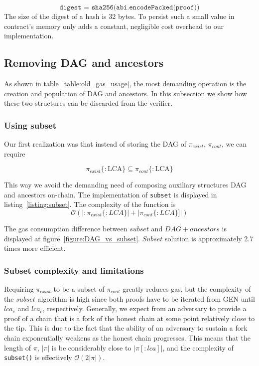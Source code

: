 \[\texttt{digest = sha256(abi.encodePacked(proof))}\] The size of the digest of
a hash is 32 bytes. To persist such a small value in contract's memory only
adds a constant, negligible cost overhead to our implementation.



\subsection{Removing DAG and ancestors}

As shown in table~\ref{table:old_gas_usage}, the most demanding operation is
the creation and population of DAG and ancestors. In this subsection we show
how these two structures can be discarded from the verifier.

\subsubsection{Using subset} Our first realization was that instead of storing the
DAG of $\pi_{exist}$, $\pi_{cont}$, we can require

\[ \pi_{exist}\{:\textrm{LCA}\} \subseteq \pi_{cont}\{:\textrm{LCA}\} \]

This way we avoid the demanding need of composing auxiliary structures DAG and
ancestors on-chain. The implementation of \texttt{subset} is displayed in
listing~\ref{listing:subset}. The complexity of the function is \[
\mathcal{O}(|:\pi_{exist}\{:LCA\}| + |\pi_{cont}\{:LCA\}]|) \]





The gas consumption difference between $subset$ and $DAG + ancestors$ is
displayed at figure~\ref{figure:DAG_vs_subset}. $Subset$ solution is
approximately 2.7 times more efficient.



\subsubsection{Subset complexity and limitations}

Requiring $\pi_{exist}$ to be a subset of $\pi_{cont}$ greatly reduces gas, but
the complexity of the $subset$ algorithm is high since both proofs have to be
iterated from GEN until $lca_e$ and $lca_c$, respectively. Generally, we expect
from an adversary to provide a proof of a chain that is a fork of the honest
chain at some point relatively close to the tip. This is due to the fact that
the ability of an adversary to sustain a fork chain exponentially weakens as
the honest chain progresses. This means that the length of $\pi$, $|\pi|$ is be
considerably close to $|\pi[:lca]|$, and the complexity of \texttt{subset()} is
effectively $\mathcal{O}(2|\pi|)$.

